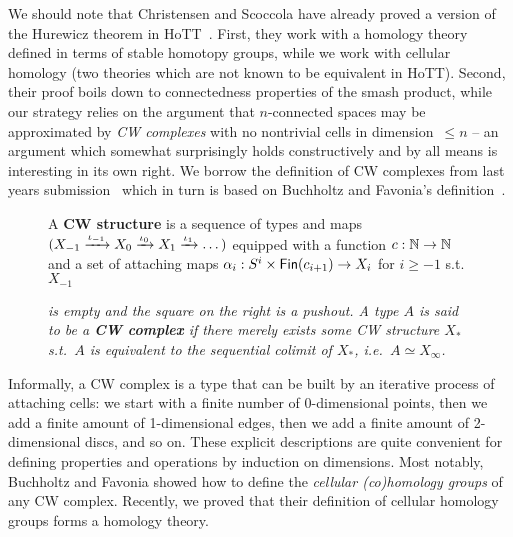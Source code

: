 \documentclass[a4page]{article}
\begin{document}
We should note that Christensen and Scoccola have already proved a version of the Hurewicz
theorem in HoTT~\cite{christensen2020hurewicz}.
%
First, they work with a homology theory defined in terms of stable
homotopy groups, while we work with cellular homology (two theories
which are not known to be equivalent in HoTT).
%
Second, their proof boils down to connectedness properties of the
smash product, while our strategy relies on the argument that \( n
\)-connected spaces may be approximated by \emph{CW complexes} with no
nontrivial cells in dimension~\( \le n \) -- an argument which
somewhat surprisingly holds constructively and by all means is interesting in its own right.
%
We borrow the definition of CW complexes from last years
submission~\cite{HoTTUF} which in turn is based on Buchholtz and
Favonia's definition~\cite{BuchholtzFavonia18}.
\begin{figure}[H]
\begin{minipage}{0.68 \linewidth}
\begin{definition}
  A \textbf{CW structure} is a sequence of types and maps
  $(X_{-1} \xrightarrow{\textnormal{\ensuremath{\iota_{-1}}}} X_0 \xrightarrow{\textnormal{\ensuremath{\iota_{0}}}} X_1 \xrightarrow{\textnormal{\ensuremath{\iota_{1}}}} \dots )$
  equipped with a function $c : \mathbb{N} \to \mathbb{N}$ and a set of attaching maps $\alpha_i : S^i \times \textnormal{\ensuremath{\mathsf{Fin}({c_{i+1}})}} \to X_i$ for $i \geq -1$ s.t. $X_{-1}$
\end{definition}
\end{minipage}
\vspace{-.1cm}
\hspace{.1cm}
\begin{minipage}{0.32 \linewidth}
\end{minipage}
\emph{is empty and the square on the right is a pushout.
  A type $A$ is said to be a \textbf{CW complex} if there merely exists some
  CW structure $X_\ast$ s.t.\ $A$ is equivalent to the sequential colimit
  of $X_\ast$, i.e.\ $A \simeq X_\infty$.}
\end{figure}
%
Informally, a CW complex is a type that can be built by an iterative process of attaching
cells: we start with a finite number of 0-dimensional points, then we add a finite
amount of 1-dimensional edges, then we add a finite amount of 2-dimensional discs, and so on.
%
These explicit descriptions are quite convenient for defining properties and operations by
induction on dimensions. Most notably, Buchholtz and Favonia showed how to define the
\emph{cellular (co)homology groups} of any CW complex.
%
Recently, we proved that their definition of cellular homology groups forms a homology theory.
\end{document}
